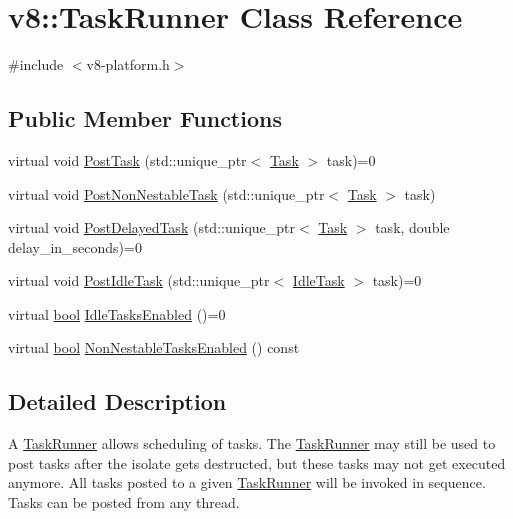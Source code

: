 \hypertarget{classv8_1_1TaskRunner}{}\section{v8\+:\+:Task\+Runner Class Reference}
\label{classv8_1_1TaskRunner}


{\ttfamily \#include $<$v8-\/platform.\+h$>$}

\subsection*{Public Member Functions}
\begin{DoxyCompactItemize}
\item 
virtual void \mbox{\hyperlink{classv8_1_1TaskRunner_a755795cc77383daf067a17673569c685}{Post\+Task}} (std\+::unique\+\_\+ptr$<$ \mbox{\hyperlink{classv8_1_1Task}{Task}} $>$ task)=0
\item 
virtual void \mbox{\hyperlink{classv8_1_1TaskRunner_ab2b73f380765e09c9ae401182a92d8e9}{Post\+Non\+Nestable\+Task}} (std\+::unique\+\_\+ptr$<$ \mbox{\hyperlink{classv8_1_1Task}{Task}} $>$ task)
\item 
virtual void \mbox{\hyperlink{classv8_1_1TaskRunner_a8ae45842086210292d966e2e326629a4}{Post\+Delayed\+Task}} (std\+::unique\+\_\+ptr$<$ \mbox{\hyperlink{classv8_1_1Task}{Task}} $>$ task, double delay\+\_\+in\+\_\+seconds)=0
\item 
virtual void \mbox{\hyperlink{classv8_1_1TaskRunner_a0ebfb362d1cb3fa621f0f50b9ff0fb6f}{Post\+Idle\+Task}} (std\+::unique\+\_\+ptr$<$ \mbox{\hyperlink{classv8_1_1IdleTask}{Idle\+Task}} $>$ task)=0
\item 
virtual \mbox{\hyperlink{classbool}{bool}} \mbox{\hyperlink{classv8_1_1TaskRunner_aa8a6077bed5735e2190918685faf20f5}{Idle\+Tasks\+Enabled}} ()=0
\item 
virtual \mbox{\hyperlink{classbool}{bool}} \mbox{\hyperlink{classv8_1_1TaskRunner_a7042a9967ddaaf1f995e568c3dd7ce64}{Non\+Nestable\+Tasks\+Enabled}} () const
\end{DoxyCompactItemize}


\subsection{Detailed Description}
A \mbox{\hyperlink{classv8_1_1TaskRunner}{Task\+Runner}} allows scheduling of tasks. The \mbox{\hyperlink{classv8_1_1TaskRunner}{Task\+Runner}} may still be used to post tasks after the isolate gets destructed, but these tasks may not get executed anymore. All tasks posted to a given \mbox{\hyperlink{classv8_1_1TaskRunner}{Task\+Runner}} will be invoked in sequence. Tasks can be posted from any thread. 


